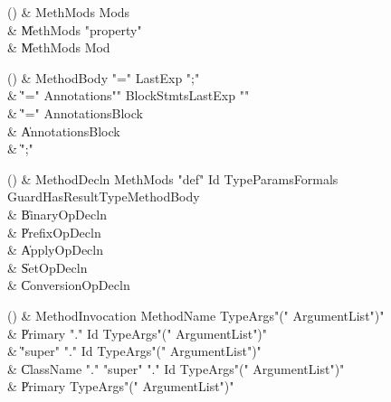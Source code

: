 \begin{bbgrammarappendix}

() & MethMods \label{prod:MethMods}  \: Mods\opt  \\

 &    \| MethMods \xcd"property"  \\
 &    \| MethMods Mod \\

\end{bbgrammarappendix}

\begin{bbgrammarappendix}

() & MethodBody \label{prod:MethodBody}  \: \xcd"=" LastExp \xcd";"  \\

 &    \| \xcd"=" Annotations\opt \xcd"{" BlockStmts\opt LastExp \xcd"}" \\
 &    \| \xcd"=" Annotations\opt Block \\
 &    \| Annotations\opt Block \\
 &    \| \xcd";" \\

\end{bbgrammarappendix}

\begin{bbgrammarappendix}

() & MethodDecln \label{prod:MethodDecln}  \: MethMods \xcd"def" Id TypeParams\opt Formals Guard\opt HasResultType\opt MethodBody  \\

 &    \| BinaryOpDecln \\
 &    \| PrefixOpDecln \\
 &    \| ApplyOpDecln \\
 &    \| SetOpDecln \\
 &    \| ConversionOpDecln \\

\end{bbgrammarappendix}

\begin{bbgrammarappendix}

() & MethodInvocation \label{prod:MethodInvocation}  \: MethodName TypeArgs\opt \xcd"(" ArgumentList\opt \xcd")"  \\

 &    \| Primary \xcd"." Id TypeArgs\opt \xcd"(" ArgumentList\opt \xcd")" \\
 &    \| \xcd"super" \xcd"." Id TypeArgs\opt \xcd"(" ArgumentList\opt \xcd")" \\
 &    \| ClassName \xcd"." \xcd"super"  \xcd"." Id TypeArgs\opt \xcd"(" ArgumentList\opt \xcd")" \\
 &    \| Primary TypeArgs\opt \xcd"(" ArgumentList\opt \xcd")" \\

\end{bbgrammarappendix}


